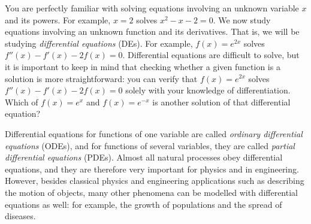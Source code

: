 You are perfectly familiar with solving equations involving an unknown variable $x$ and its powers. For example, $x=2$ solves $x^2-x-2=0$. We now study equations involving an unknown function and its derivatives. That is, we will be studying \emph{differential equations} (DEs). For example, $f(x)=e^{2x}$ solves $f''(x)-f'(x)-2f(x)=0$. Differential equations are difficult to solve, but it is important to keep in mind that checking whether a given function is a solution is more straightforward: you can verify that $f(x)=e^{2x}$ solves $f''(x)-f'(x)-2f(x)=0$ solely with your knowledge of differentiation. Which of $f(x)=e^{x}$ and $f(x)=e^{-x}$ is another solution of that differential equation?

Differential equations for functions of one variable are called \emph{ordinary differential equations} (ODEs), and for functions of several variables, they are called \emph{partial differential equations} (PDEs). Almost all natural processes obey differential equations, and they are therefore very important for physics and in engineering. However, besides classical physics and engineering applications such as describing the motion of objects, many other phenomena can be modelled with differential equations as well: for example, the growth of populations and the spread of diseases.

